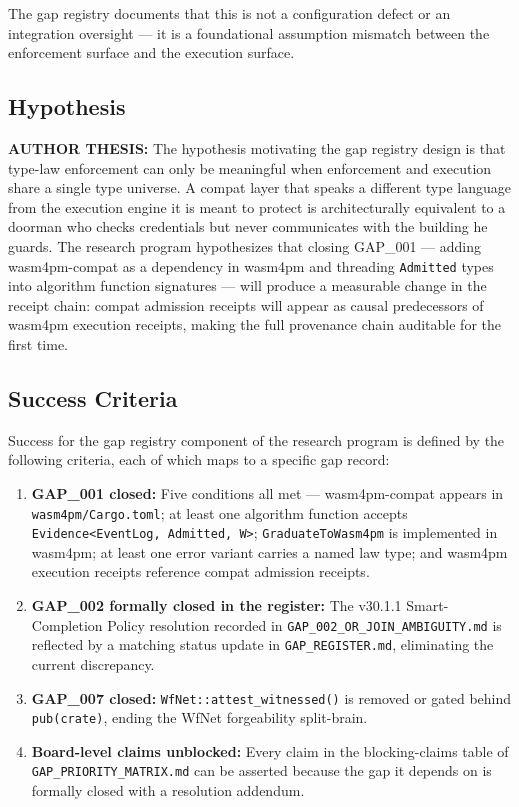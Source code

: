 The gap registry documents that this is not a configuration defect or an integration
oversight — it is a foundational assumption mismatch between the enforcement surface and
the execution surface.

\subsection{Hypothesis}
\label{sec:gaps-rq-hypothesis}

\textbf{AUTHOR THESIS:} The hypothesis motivating the gap registry design is that
type-law enforcement can only be meaningful when enforcement and execution share a
single type universe. A compat layer that speaks a different type language from the
execution engine it is meant to protect is architecturally equivalent to a doorman who
checks credentials but never communicates with the building he guards. The research
program hypothesizes that closing GAP\_001 — adding wasm4pm-compat as a dependency in
wasm4pm and threading \texttt{Admitted} types into algorithm function signatures — will
produce a measurable change in the receipt chain: compat admission receipts will appear
as causal predecessors of wasm4pm execution receipts, making the full provenance chain
auditable for the first time.

\subsection{Success Criteria}
\label{sec:gaps-rq-success}

Success for the gap registry component of the research program is defined by the
following criteria, each of which maps to a specific gap record:

\begin{enumerate}
  \item \textbf{GAP\_001 closed:} Five conditions all met — wasm4pm-compat appears in
        \texttt{wasm4pm/Cargo.toml}; at least one algorithm function accepts
        \texttt{Evidence<EventLog, Admitted, W>}; \texttt{GraduateToWasm4pm} is
        implemented in wasm4pm; at least one error variant carries a named law type; and
        wasm4pm execution receipts reference compat admission receipts.
  \item \textbf{GAP\_002 formally closed in the register:} The v30.1.1 Smart-Completion
        Policy resolution recorded in \texttt{GAP\_002\_OR\_JOIN\_AMBIGUITY.md} is
        reflected by a matching status update in \texttt{GAP\_REGISTER.md}, eliminating
        the current discrepancy.
  \item \textbf{GAP\_007 closed:} \texttt{WfNet::attest\_witnessed()} is removed or
        gated behind \texttt{pub(crate)}, ending the WfNet forgeability split-brain.
  \item \textbf{Board-level claims unblocked:} Every claim in the blocking-claims table
        of \texttt{GAP\_PRIORITY\_MATRIX.md} can be asserted because the gap it depends
        on is formally closed with a resolution addendum.
\end{enumerate}
